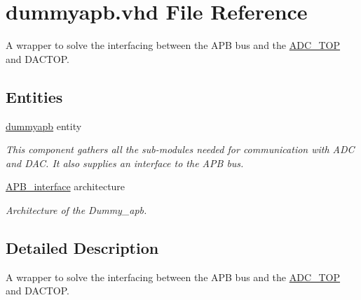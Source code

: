 \hypertarget{dummyapb_8vhd}{\section{dummyapb.\-vhd File Reference}
\label{dummyapb_8vhd}
}


A wrapper to solve the interfacing between the A\-P\-B bus and the \hyperlink{classADC__TOP}{A\-D\-C\-\_\-\-T\-O\-P} and D\-A\-C\-T\-O\-P.  


\subsection*{Entities}
\begin{DoxyCompactItemize}
\item 
\hyperlink{classdummyapb}{dummyapb} entity
\begin{DoxyCompactList}\small\item\em This component gathers all the sub-\/modules needed for communication with A\-D\-C and D\-A\-C. It also supplies an interface to the A\-P\-B bus. \end{DoxyCompactList}\item 
\hyperlink{classdummyapb_1_1APB__interface}{A\-P\-B\-\_\-interface} architecture
\begin{DoxyCompactList}\small\item\em Architecture of the Dummy\-\_\-apb. \end{DoxyCompactList}\end{DoxyCompactItemize}


\subsection{Detailed Description}
A wrapper to solve the interfacing between the A\-P\-B bus and the \hyperlink{classADC__TOP}{A\-D\-C\-\_\-\-T\-O\-P} and D\-A\-C\-T\-O\-P. 
